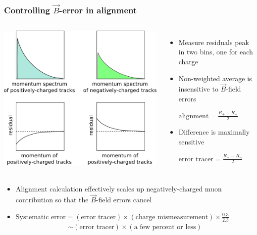 \documentclass[compress]{beamer}
\begin{document}
\begin{frame}
\frametitle{Controlling $\vec{B}$-error in alignment}

\vspace{0.5 cm}
\begin{columns}
\includegraphics[width=\linewidth]{momentum_explanation.png}

\begin{itemize}
\item Measure residuals peak in two bins, one for each charge
\item Non-weighted average is insensitive to $\vec{B}$-field errors

$\displaystyle \mbox{alignment} = \frac{R_+ + R_-}{2}$

\item Difference is maximally sensitive

$\displaystyle \mbox{error tracer} = \frac{R_+ - R_-}{2}$

\end{itemize}
\end{columns}

\begin{itemize}\setlength{\itemsep}{-0.1 cm}
\item Alignment calculation effectively scales up negatively-charged muon contribution so that the $\vec{B}$-field errors cancel
\item \mbox{$\displaystyle \mbox{Systematic error} = \left(\mbox{error tracer}\right) \times \left(\mbox{charge mismeasurement}\right) \times \frac{0.3}{2.3}$} \\
\textcolor{white}{$\mbox{Systematic error}$} $\sim \left(\mbox{error tracer}\right) \times \left(\mbox{a few percent or less}\right)$

\end{itemize}
\end{frame}
\end{document}
